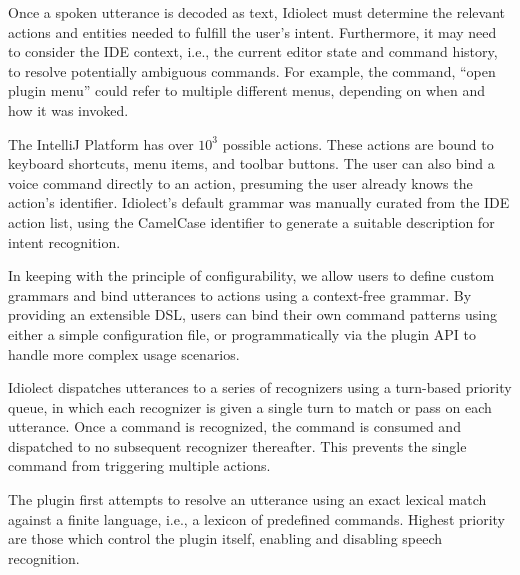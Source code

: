\documentclass[conference]{IEEEtran}
\begin{document}
Once a spoken utterance is decoded as text, Idiolect must determine the relevant actions and entities needed to fulfill the user's intent. Furthermore, it may need to consider the IDE context, i.e., the current editor state and command history, to resolve potentially ambiguous commands. For example, the command, ``open plugin menu'' could refer to multiple different menus, depending on when and how it was invoked.

The IntelliJ Platform has over $10^3$ possible actions. These actions are bound to keyboard shortcuts, menu items, and toolbar buttons. The user can also bind a voice command directly to an action, presuming the user already knows the action's identifier. Idiolect's default grammar was manually curated from the IDE action list, using the CamelCase identifier to generate a suitable description for intent recognition.

In keeping with the principle of configurability, we allow users to define custom grammars and bind utterances to actions using a context-free grammar. By providing an extensible DSL, users can bind their own command patterns using either a simple configuration file, or programmatically via the plugin API to handle more complex usage scenarios.



Idiolect dispatches utterances to a series of recognizers using a turn-based priority queue, in which each recognizer is given a single turn to match or pass on each utterance. Once a command is recognized, the command is consumed and dispatched to no subsequent recognizer thereafter. This prevents the single command from triggering multiple actions.

The plugin first attempts to resolve an utterance using an exact lexical match against a finite language, i.e., a lexicon of predefined commands. Highest priority are those which control the plugin itself, enabling and disabling speech recognition.
\end{document}

